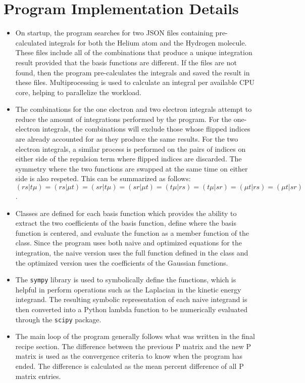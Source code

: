 \documentclass[10pt, oneside, letterpaper]{article}
\begin{document}
\newpage
\section{Program Implementation Details}

\begin{itemize}
  \item On startup, the program searches for two JSON files containing pre-calculated integrals for both the Helium atom and the Hydrogen molecule. These files include all of the combinations that produce a unique integration result provided that the basis functions are different. If the files are not found, then the program pre-calculates the integrals and saved the result in these files. Multiprocessing is used to calculate an integral per available CPU core, helping to parallelize the workload.
  \item The combinations for the one electron and two electron integrals attempt to reduce the amount of integrations performed by the program. For the one-electron integrals, the combinations will exclude those whose flipped indices are already accounted for as they produce the same results. For the two electron integrals, a similar process is performed on the pairs of indices on either side of the repulsion term where flipped indices are discarded. The symmetry where the two functions are swapped at the same time on either side is also respeted. This can be summarized as follows:
  $(rs|t\mu) = (rs|\mu t) = (sr|t\mu) = (sr|\mu t) = (t\mu|rs) = (t\mu|sr) = (\mu t|rs) = (\mu t|sr)$ \cite{hartree-fock-in-100-lines}.
  \item Classes are defined for each basis function which provides the ability to extract the two coefficients of the basis function, define where the basis function is centered, and evaluate the function as a member function of the class. Since the program uses both naive and optimized equations for the integration, the naive version uses the full function defined in the class and the optimized version uses the coefficients of the Gaussian functions.
  \item The \texttt{sympy} library is used to symbolically define the functions, which is helpful in perform operations such as the Laplacian in the kinetic energy integrand. The resulting symbolic representation of each naive integrand is then converted into a Python lambda function to be numerically evaluated through the \texttt{scipy} package.
  \item The main loop of the program generally follows what was written in the final recipe section. The difference between the previous P matrix and the new P matrix is used as the convergence criteria to know when the program has ended. The difference is calculated as the mean percent difference of all P matrix entries.
\end{itemize}
\end{document}
